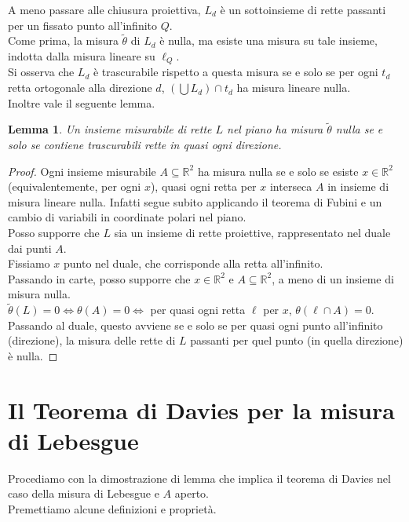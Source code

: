 \documentclass[a4paper, twoside,openright]{article}
\newcommand{\LRa}{\Leftrightarrow}
\newcommand{\R}{\mathbb{R}}
\newcommand{\<}{\langle}
\renewcommand{\>}{\rangle}
\newtheorem{lemma}[teo]{Lemma}
\begin{document}
A meno passare alle chiusura proiettiva, $L_{d}$ è un sottoinsieme di rette passanti per un fissato punto all'infinito $Q$.\\
Come prima, la misura $\tilde \theta$ di $L_d$ è nulla, ma esiste una misura su tale insieme, indotta dalla misura lineare su $\ell_Q$.\\
Si osserva che $L_d$ è trascurabile rispetto a questa misura se e solo se per ogni $t_d$ retta ortogonale alla direzione $d$, $ (\bigcup L_d) \cap t_d$ ha misura lineare nulla.\\
Inoltre vale il seguente lemma.

\begin{lemma}
	Un insieme misurabile di rette $L$ nel piano ha misura $\tilde \theta$ nulla se e solo se contiene trascurabili rette in quasi ogni direzione. 
\end{lemma}

\begin{proof}
	Ogni insieme misurabile $A \subseteq \R^2$ ha misura nulla se e solo se esiste $x \in \R^2$ (equivalentemente, per ogni $x$), quasi ogni retta per $x$ interseca $A$ in insieme di misura lineare nulla. Infatti segue subito applicando il teorema di Fubini e un cambio di variabili in coordinate polari nel piano.\\
	Posso supporre che $L$ sia un insieme di rette proiettive, rappresentato nel duale dai punti $A$.\\
	Fissiamo $x$ punto nel duale, che corrisponde alla retta all'infinito.\\
	Passando in carte, posso supporre che $x \in \R^2$ e $A\subseteq \R^2$, a meno di un insieme di misura nulla.\\
	$\tilde \theta (L)=0 \LRa \theta(A)=0 \LRa$ per quasi ogni retta $\ell$ per $x$, $\theta(\ell \cap A)=0$.\\
	Passando al duale, questo avviene se e solo se per quasi ogni punto all'infinito (direzione), la misura delle rette di $L$ passanti per quel punto (in quella direzione) è nulla.
\end{proof}	



	
\newpage

\section{Il Teorema di Davies per la misura di Lebesgue}

Procediamo con la dimostrazione di lemma che implica il teorema di Davies nel caso della misura di Lebesgue e $A$ aperto.\\
Premettiamo alcune definizioni e proprietà.
\end{document}
